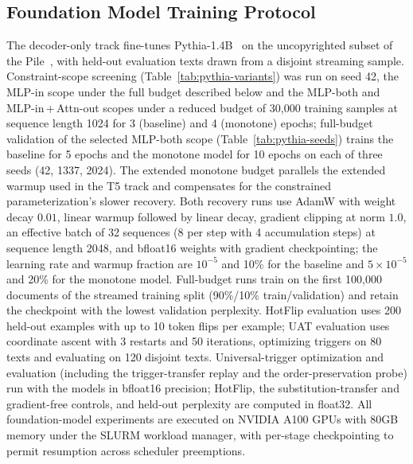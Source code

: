 \documentclass{article}
\theoremstyle{plain}
\theoremstyle{definition}
\theoremstyle{remark}
\theoremstyle{plain}
\begin{document}
\subsection{Foundation Model Training Protocol}
\label{app:pythia}
The decoder-only track fine-tunes Pythia-1.4B~\citep{biderman2023pythia} on the uncopyrighted subset of the Pile~\citep{gao2020pile}, with held-out evaluation texts drawn from a disjoint streaming sample. Constraint-scope screening (Table~\ref{tab:pythia-variants}) was run on seed 42, the MLP-in scope under the full budget described below and the MLP-both and MLP-in\,+\,Attn-out scopes under a reduced budget of 30{,}000 training samples at sequence length 1024 for 3 (baseline) and 4 (monotone) epochs; full-budget validation of the selected MLP-both scope (Table~\ref{tab:pythia-seeds}) trains the baseline for 5 epochs and the monotone model for 10 epochs on each of three seeds (42, 1337, 2024). The extended monotone budget parallels the extended warmup used in the T5 track and compensates for the constrained parameterization's slower recovery.
Both recovery runs use AdamW with weight decay $0.01$, linear warmup followed by linear decay, gradient clipping at norm $1.0$, an effective batch of 32 sequences (8 per step with 4 accumulation steps) at sequence length 2048, and bfloat16 weights with gradient checkpointing; the learning rate and warmup fraction are $10^{-5}$ and 10\% for the baseline and $5\times 10^{-5}$ and 20\% for the monotone model. Full-budget runs train on the first 100{,}000 documents of the streamed training split (90\%/10\% train/validation) and retain the checkpoint with the lowest validation perplexity. HotFlip evaluation uses 200 held-out examples with up to 10 token flips per example; UAT evaluation uses coordinate ascent with 3 restarts and 50 iterations, optimizing triggers on 80 texts and evaluating on 120 disjoint texts. Universal-trigger optimization and evaluation (including the trigger-transfer replay and the order-preservation probe) run with the models in bfloat16 precision; HotFlip, the substitution-transfer and gradient-free controls, and held-out perplexity are computed in float32.
All foundation-model experiments are executed on NVIDIA A100 GPUs with 80GB memory under the SLURM workload manager, with per-stage checkpointing to permit resumption across scheduler preemptions.

\end{document}
